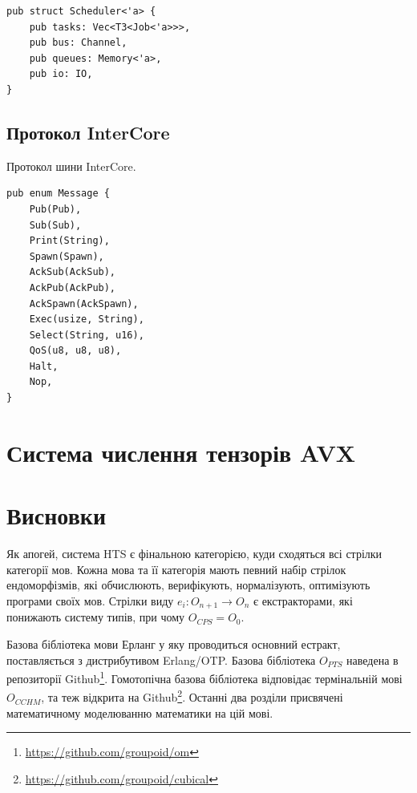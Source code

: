 \begin{lstlisting}
pub struct Scheduler<'a> {
    pub tasks: Vec<T3<Job<'a>>>,
    pub bus: Channel,
    pub queues: Memory<'a>,
    pub io: IO,
}
\end{lstlisting}

\subsection{Протокол InterCore}
Протокол шини InterCore.

\begin{lstlisting}
pub enum Message {
    Pub(Pub),
    Sub(Sub),
    Print(String),
    Spawn(Spawn),
    AckSub(AckSub),
    AckPub(AckPub),
    AckSpawn(AckSpawn),
    Exec(usize, String),
    Select(String, u16),
    QoS(u8, u8, u8),
    Halt,
    Nop,
}
\end{lstlisting}

\section{Система числення тензорів AVX}

\section{Висновки}
Як апогей, система HTS є фінальною категорією,
куди сходяться всі стрілки категорії мов. Кожна мова та її категорія
мають певний набір стрілок ендоморфізмів, які обчислюють, верифікують,
нормалізують, оптимізують програми своїх мов.
Стрілки виду $e_i: O_{n+1} \rightarrow O_n$ є екстракторами, які понижають систему типів,
при чому $O_{CPS} = O_0$.

Базова бібліотека мови Ерланг у яку проводиться основний
естракт, поставляється з дистрибутивом Erlang/OTP. Базова бібліотека
$O_{PTS}$ наведена в репозиторії Github\footnote{\url{https://github.com/groupoid/om}}.
Гомотопічна базова бібліотека відповідає термінальній мові $O_{CCHM}$, та теж відкрита
на Github\footnote{\url{https://github.com/groupoid/cubical}}.
Останні два розділи присвячені математичному моделюванню математики на цій мові.

